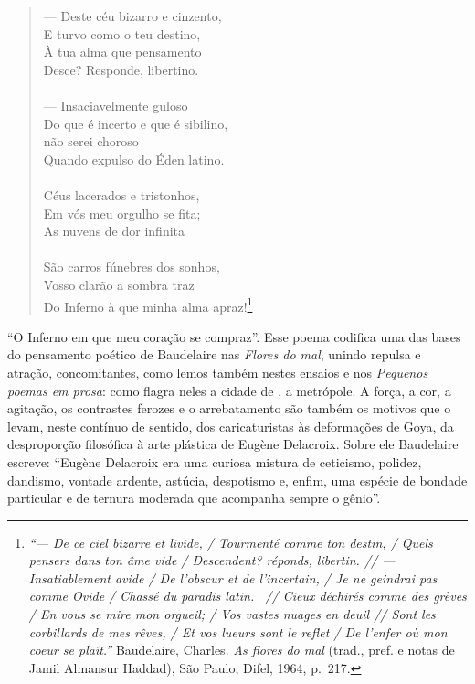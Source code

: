 \begin{hedraquote}
\begin{verse}
--- Deste céu bizarro e cinzento,\\
E turvo como o teu destino, \\
À tua alma que pensamento \\ 
Desce? Responde, libertino. \\ 
\ \\ 
--- Insaciavelmente guloso \\
Do que é incerto e que é sibilino, \\ 
 não serei choroso \\ 
Quando expulso do Éden latino. \\ 
 \ \\
Céus lacerados e tristonhos, \\  
Em vós meu orgulho se fita; \\
As nuvens de dor infinita\\ 
 \ \\
São carros fúnebres dos sonhos, \\ 
Vosso clarão a sombra traz \\ 
Do Inferno à que minha alma apraz!\footnote{ \textit{``--- De ce ciel bizarre et livide, / 
Tourmenté comme ton destin, /
Quels pensers dans ton âme vide / 
Descendent? réponds, libertin. //
--- Insatiablement avide /
De l'obscur et de l'incertain, /
Je ne geindrai pas comme Ovide /
Chassé du paradis latin.  //
Cieux déchirés comme des grèves /
En vous se mire mon orgueil; /
Vos vastes nuages en deuil //
Sont les corbillards de mes rêves, / 
Et vos lueurs sont le reflet /
De l'enfer où mon coeur se plaît.''}
Baudelaire, Charles. \textit{As flores do mal} (trad.,
pref. e notas de Jamil Almansur Haddad), São Paulo, Difel, 1964, p.~217.} 
\end{verse}
\end{hedraquote}

“O Inferno em que meu coração se compraz”. Esse poema codifica uma das
bases do pensamento poético de Baudelaire nas \textit{Flores do mal},
unindo repulsa e atração, concomitantes, como lemos também nestes
ensaios e nos \textit{Pequenos poemas em prosa}: como flagra neles a
cidade de , a metrópole. A força, a cor, a agitação, os contrastes
ferozes e o arrebatamento são também os motivos que o levam, neste
contínuo de sentido, dos caricaturistas às deformações de Goya, da
desproporção filosófica à arte plástica de Eugène Delacroix. Sobre ele
Baudelaire escreve: “Eugène Delacroix era uma curiosa mistura de
ceticismo, polidez, dandismo, vontade ardente, astúcia, despotismo e,
enfim, uma espécie de bondade particular e de ternura moderada que
acompanha sempre o gênio”.

